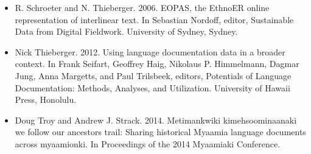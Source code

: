 \documentclass{beamer}
\begin{document}
\begin{frame}
\begin{itemize}
  \item R. Schroeter and N. Thieberger. 2006. EOPAS, the EthnoER online representation of interlinear text. In Sebastian Nordoff, editor, Sustainable Data from Digital Fieldwork. University of Sydney, Sydney.
  \item Nick Thieberger. 2012. Using language documentation data in a broader context. In Frank Seifart, Geoffrey Haig, Nikolaus P. Himmelmann, Dagmar Jung, Anna Margetts, and Paul Trilsbeek, editors, Potentials of Language Documentation: Methods, Analyses, and Utilization. University of Hawaii Press, Honolulu.
  \item Doug Troy and Andrew J. Strack. 2014. Metimankwiki kimehsoominaanaki we follow our ancestors trail: Sharing historical Myaamia language documents across myaamionki. In Proceedings of the 2014 Myaamiaki Conference.
\end{itemize}
\end{frame}
\end{document}
